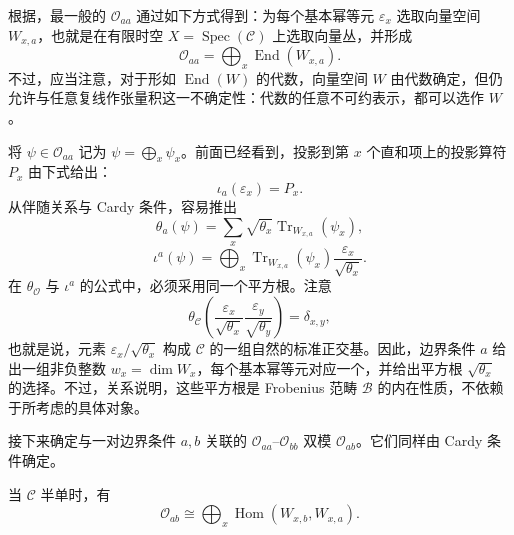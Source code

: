 根据，最一般的 $\mathcal{O}_{aa}$ 通过如下方式得到：为每个基本幂等元 $\varepsilon_x$ 选取向量空间 $W_{x,a}$，也就是在有限时空 $X=\operatorname{Spec}(\mathcal{C})$ 上选取向量丛，并形成
\begin{equation}\label{eq:2.33}
\mathcal{O}_{aa}=\bigoplus_x\operatorname{End}(W_{x,a}).
\end{equation}
不过，应当注意，对于形如 $\operatorname{End}(W)$ 的代数，向量空间 $W$ 由代数确定，但仍允许与任意复线作张量积这一不确定性：代数的任意不可约表示，都可以选作 $W$。

将 $\psi\in\mathcal{O}_{aa}$ 记为 $\psi=\bigoplus_x\psi_x$。前面已经看到，投影到第 $x$ 个直和项上的投影算符 $P_x$ 由下式给出：
\begin{equation}\label{eq:2.34}
\iota_a(\varepsilon_x)=P_x.
\end{equation}
从伴随关系与 Cardy 条件，容易推出
\begin{equation}\label{eq:2.35}
\theta_a(\psi)=\sum_x\sqrt{\theta_x}\operatorname{Tr}_{W_{x,a}}(\psi_x),
\end{equation}
\begin{equation}\label{eq:2.36}
\iota^a(\psi)=\bigoplus_x\operatorname{Tr}_{W_{x,a}}(\psi_x)\frac{\varepsilon_x}{\sqrt{\theta_x}}.
\end{equation}
在 $\theta_{\mathcal{O}}$ 与 $\iota^a$ 的公式中，必须采用同一个平方根。注意
\[
\theta_{\mathcal{C}}\left(\frac{\varepsilon_x}{\sqrt{\theta_x}}\frac{\varepsilon_y}{\sqrt{\theta_y}}\right)=\delta_{x,y},
\]
也就是说，元素 $\varepsilon_x/\sqrt{\theta_x}$ 构成 $\mathcal{C}$ 的一组自然的标准正交基。因此，边界条件 $a$ 给出一组非负整数 $w_x=\dim W_x$，每个基本幂等元对应一个，并给出平方根 $\sqrt{\theta_x}$ 的选择。不过，关系说明，这些平方根是 Frobenius 范畴 $\mathcal{B}$ 的内在性质，不依赖于所考虑的具体对象。

接下来确定与一对边界条件 $a,b$ 关联的 $\mathcal{O}_{aa}$--$\mathcal{O}_{bb}$ 双模 $\mathcal{O}_{ab}$。它们同样由 Cardy 条件确定。

\begin{lemma}\label{lem:2.7}
当 $\mathcal{C}$ 半单时，有
\begin{equation}\label{eq:2.37}
\mathcal{O}_{ab}\cong\bigoplus_x\operatorname{Hom}(W_{x,b},W_{x,a}).
\end{equation}
\end{lemma}

